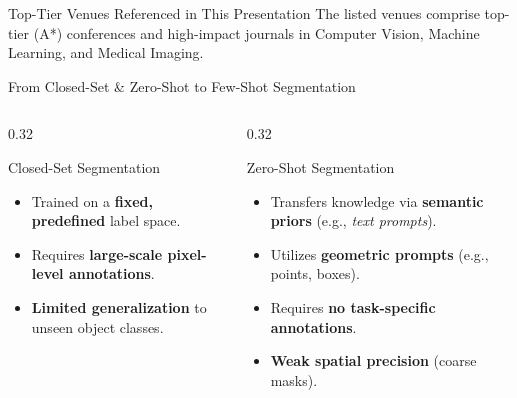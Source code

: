 \documentclass[aspectratio=169, 10pt]{beamer}
\begin{document}
\begin{frame}{Top-Tier Venues Referenced in This Presentation}
\vspace{0.3cm}
\centering
\footnotesize The listed venues comprise top-tier (A*) conferences and high-impact journals in Computer Vision, Machine Learning, and Medical Imaging.
\end{frame}

\begin{frame}{From Closed-Set \& Zero-Shot to Few-Shot Segmentation}
    \begin{columns}[T]
        \begin{column}{0.32\textwidth}
            \begin{alertblock}{Closed-Set Segmentation}
                \begin{itemize}
                    \item Trained on a \textbf{fixed, predefined} label space.
                    \item Requires \textbf{large-scale pixel-level annotations}.
                    \item \textbf{Limited generalization} to unseen object classes.
                \end{itemize}
            \end{alertblock}
        \end{column}

        \begin{column}{0.32\textwidth}
            \begin{block}{Zero-Shot Segmentation}
                \begin{itemize}
                    \item Transfers knowledge via \textbf{semantic priors} (e.g., \textit{text prompts}).
                    \item Utilizes \textbf{geometric prompts} (e.g., points, boxes).
                    \item Requires \textbf{no task-specific annotations}.
                    \item \textbf{Weak spatial precision} (coarse masks).
                \end{itemize}
            \end{block}
        \end{column}
        

\end{columns}
\end{frame}
\end{document}
